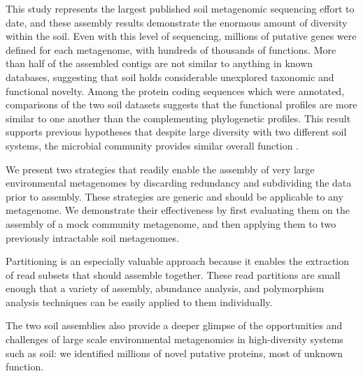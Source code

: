 \documentclass{nature}%
\begin{document}
This study represents the largest published soil metagenomic sequencing effort
to date, and these assembly results demonstrate the enormous amount of
diversity within the soil.  Even with this level of sequencing,
millions of putative genes were defined for each metagenome, with
hundreds of thousands of functions.
More than half of the assembled contigs are not similar to anything in
known databases, suggesting that soil holds considerable unexplored
taxonomic and functional novelty.
Among the
protein coding sequences which were annotated, comparisons of the two
soil datasets suggests that the functional profiles are more similar
to one another than the complementing phylogenetic profiles.  This
result supports previous hypotheses that despite large diversity with
two different soil systems, the microbial community provides similar
overall function \cite{Girvan:2005jv,McGradySteed:1997uj,Muller:2002cd,Konstantinidis:2004hr}.



We present two strategies that readily enable the assembly of very
large environmental metagenomes by discarding redundancy and
subdividing the data prior to assembly.  These strategies are generic and should
be applicable to any metagenome.  We demonstrate their effectiveness by
first evaluating them on the assembly of a mock community metagenome,
and then applying them to two previously intractable soil metagenomes.

Partitioning is an especially valuable approach because it enables the
extraction of read subsets that should assemble together.  These read
partitions are small enough that a variety of assembly, abundance
analysis, and polymorphism analysis techniques can be easily applied
to them individually.

The two soil assemblies also provide a deeper glimpse of the
opportunities and challenges of large scale environmental metagenomics
in high-diversity systems such as soil: we identified millions of
novel putative proteins, most of unknown function.
\end{document}
